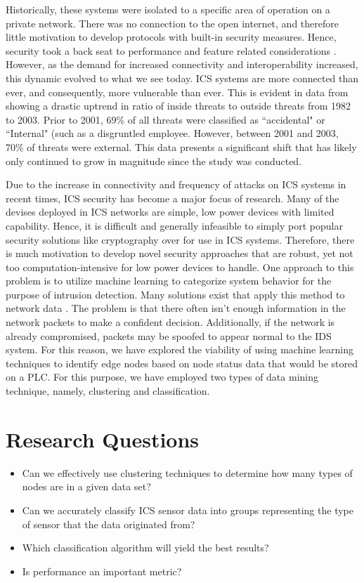 \documentclass[letterpaper, 10 pt, conference]{ieeeconf}  %
\begin{document}
Historically, these systems were isolated to a specific area of operation on a private network. There was no connection to the open internet, and therefore little motivation to develop protocols with built-in security measures. Hence, security took a back seat to performance and feature related considerations \cite{igure2006security}. However, as the demand for increased connectivity and interoperability increased, this dynamic evolved to what we see today. ICS systems are more connected than ever, and consequently, more vulnerable than ever. This is evident in data from \cite{byres2004myths} showing a drastic uptrend in ratio of inside threats to outside threats from 1982 to 2003. Prior to 2001, 69\% of all threats were classified as ``accidental" or ``Internal" (such as a disgruntled employee. However, between 2001 and 2003, 70\% of threats were external. This data presents a significant shift that has likely only continued to grow in magnitude since the study was conducted.

Due to the increase in connectivity and frequency of attacks on ICS systems in recent times, ICS security has become a major focus of research. Many of the devises deployed in ICS networks are simple, low power devices with limited capability. Hence, it is difficult and generally infeasible to simply port popular security solutions like cryptography over for use in ICS systems. Therefore, there is much motivation to develop novel security approaches that are robust, yet not too computation-intensive for low power devices to handle. 
One approach to this problem is to utilize machine learning to categorize system behavior for the purpose of intrusion detection. Many solutions exist that apply this method to network data \cite{ponomarev2015industrial, schuster2013towards, feng2017multi, terai2017cyber, hijazi2018deep}. The problem is that there often isn't enough information in the network packets to make a confident decision. Additionally, if the network is already compromised, packets may be spoofed to appear normal to the IDS system. For this reason, we have explored the viability of using machine learning techniques to identify edge nodes based on node status data that would be stored on a PLC. For this purpose, we have employed two types of data mining technique, namely, clustering and classification.


\section{Research Questions}
\begin{itemize}
    \item Can we effectively use clustering techniques to determine how many types of nodes are in a given data set?
    \item Can we accurately classify ICS sensor data into groups representing the type of sensor that the data originated from?
    \item Which classification algorithm will yield the best results?
    \item Is performance an important metric?
\end{itemize}
\end{document}
